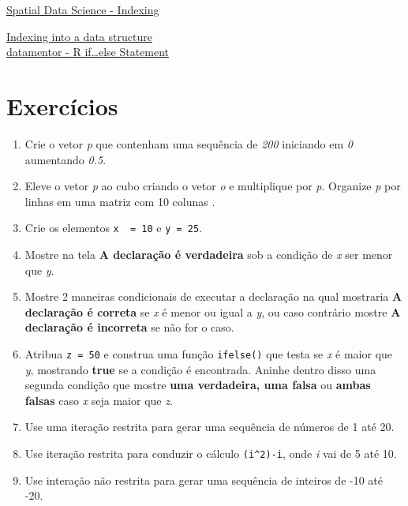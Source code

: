 \documentclass[
]{book}
\providecommand{\tightlist}{%
  \setlength{\itemsep}{0pt}\setlength{\parskip}{0pt}}
\begin{document}
\citet{melloandpeternelli2013}

\citet{RogerPeng2020RPro}

\citet{Kabacoff2015R}

\citet{VenablesSmithRTeamCore2017}

\citet{Neth2021}

\citet{Yamamoto2020}

\citet{SergioFreireINTRO2020}

\href{https://rspatial.org/intr/4-indexing.html}{Spatial Data Science - Indexing}

\href{http://www.cookbook-r.com/Basics/Indexing_into_a_data_structure/}{Indexing into a data structure}\\
\href{https://www.datamentor.io/r-programming/if-else-statement/}{datamentor - R if\ldots else Statement}

\hypertarget{exercuxedcios}{%
\section{Exercícios}\label{exercuxedcios}}

\begin{enumerate}
\def\labelenumi{\arabic{enumi}.}
\tightlist
\item
  Crie o vetor \emph{p} que contenham uma sequência de \emph{200} iniciando em \emph{0} aumentando \emph{0.5}.
\item
  Eleve o vetor \emph{p} ao cubo criando o vetor \emph{o} e multiplique por \emph{p}.
  Organize \emph{p} por linhas em uma matriz com 10 colunas .\\
\item
  Crie os elementos \texttt{x\ \ =\ 10} e \texttt{y\ =\ 25}.
\item
  Mostre na tela \textbf{A declaração é verdadeira} sob a condição de \emph{x} ser menor que \emph{y}.
\item
  Mostre 2 maneiras condicionais de executar a declaração na qual mostraria \textbf{A declaração é correta} se \emph{x} é menor ou igual a \emph{y}, ou caso contrário mostre \textbf{A declaração é incorreta} se não for o caso.
\item
  Atribua \texttt{z\ =\ 50} e construa uma função \texttt{ifelse()} que testa se \emph{x} é maior que \emph{y}, mostrando \textbf{true} se a condição é encontrada. Aninhe dentro disso uma segunda condição que mostre \textbf{uma verdadeira, uma falsa} ou \textbf{ambas falsas} caso \emph{x} seja maior que \emph{z}.
\item
  Use uma iteração restrita para gerar uma sequência de números de 1 até 20.
\item
  Use iteração restrita para conduzir o cálculo \texttt{(i\^{}2)-i}, onde \emph{i} vai de 5 até 10.
\item
  Use interação não restrita para gerar uma sequência de inteiros de -10 até -20.
\end{enumerate}

  
\end{document}
